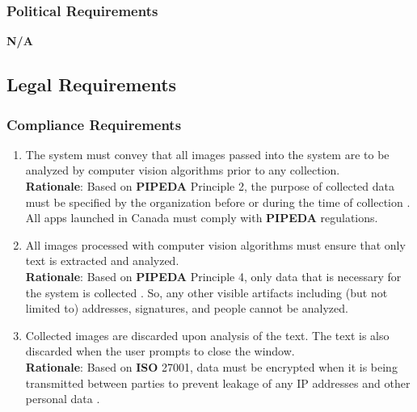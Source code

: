\subsubsection{Political Requirements}
\label{ssub:political_requirements}
\textbf{N/A}


\subsection{Legal Requirements}
\label{sub:legal_requirements}

\subsubsection{Compliance Requirements}
\label{ssub:compliance_requirements}
\begin{enumerate}[{LR-COMP}1. ]
	\item The system must convey that all images passed into the system are to be analyzed by computer vision algorithms prior to any collection.
	\\ \textbf{Rationale}: Based on \textbf{PIPEDA} Principle 2, the purpose of collected data must be specified by the organization before or during the time of collection \cite{PIPEDA2025}. All apps launched in Canada must comply with \textbf{PIPEDA} regulations.
	\item All images processed with computer vision algorithms must ensure that only text is extracted and analyzed.
	\\ \textbf{Rationale}: Based on \textbf{PIPEDA} Principle 4, only data that is necessary for the system is collected \cite{PIPEDA2025}. So, any other visible artifacts including (but not limited to) addresses, signatures, and people cannot be analyzed.
	\item Collected images are discarded upon analysis of the text. The text is also discarded when the user prompts to close the window.
	\\ \textbf{Rationale}: Based on \textbf{ISO} 27001, data must be encrypted when it is being transmitted between parties to prevent leakage of any IP addresses and other personal data \cite{ISMS2025}.
\end{enumerate}

